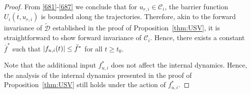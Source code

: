 \begin{proof}
	From \eqref{681}-\eqref{687} we conclude that for $u_{r, i}\in\mathcal{C}_i$, the barrier function $U_i(t,u_{r, i})$ is bounded along the trajectories. Therefore, akin to the forward invariance of $\mathcal{\tilde D}$ established in the proof of Proposition~\ref{thm:USV}, it is straightforward to show forward invariance of $\mathcal{C}_i$.
	Hence, there exists a constant $\bar{f}^*$ such that $\left|f_{u, i}(t)\right|\leq\bar{f}^*$ for all $t\geq t_0$.

	Note that the additional input $f_{u, i}^*$ does not affect the internal dynamics. Hence, the analysis of the internal dynamics presented in the proof of Proposition~\ref{thm:USV} still holds under the action of $f_{u, i}^*$.	
\end{proof}

